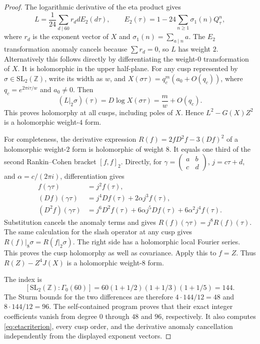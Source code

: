 \documentclass[11pt,a4paper]{article}
\theoremstyle{remark}
\newcommand{\code}[1]{\path{#1}}
\begin{document}
\begin{proof}
The logarithmic derivative of the eta product gives
\begin{equation}\label{eq:LE2}
 L=\frac1{24}\sum_{d\mid60}r_d d E_2(d\tau),
 \qquad
 E_2(\tau)=1-24\sum_{n\geq1}\sigma_1(n)Q_\tau^n,
\end{equation}
where $r_d$ is the exponent vector of $X$ and
$\sigma_1(n)=\sum_{a\mid n}a$. The $E_2$ transformation anomaly
cancels because $\sum r_d=0$, so $L$ has weight $2$.
Alternatively this follows directly by differentiating the weight-$0$
transformation of $X$. It is holomorphic in the upper half-plane.
For any cusp represented by $\sigma\in\mathrm{SL}_2(\mathbb Z)$,
write its width as $w$, and
$X(\sigma\tau)=q_c^m(a_0+O(q_c))$, where
$q_c=e^{2\pi i\tau/w}$ and $a_0\ne0$. Then
\[
 (L|_2\sigma)(\tau)=D\log X(\sigma\tau)
                  =\frac m w+O(q_c).
\]
This proves holomorphy at all cusps, including poles of $X$.
Hence $L^2-G(X)Z^2$ is a holomorphic weight-$4$ form.

For completeness, the derivative expression
$R(f)=2fD^2f-3(Df)^2$ of a holomorphic weight-$2$ form is holomorphic
of weight $8$. It equals one third of the second Rankin--Cohen bracket
$[f,f]_2$. Directly, for
$\gamma=\left(\begin{smallmatrix}a&b\\c&d\end{smallmatrix}\right)$,
$j=c\tau+d$, and $\alpha=c/(2\pi i)$, differentiation gives
\begin{align*}
 f(\gamma\tau)&=j^2f(\tau),\\
 (Df)(\gamma\tau)&=j^4Df(\tau)+2\alpha j^3f(\tau),\\
 (D^2f)(\gamma\tau)&=j^6D^2f(\tau)+6\alpha j^5Df(\tau)
                                  +6\alpha^2j^4f(\tau).
\end{align*}
Substitution cancels the anomaly terms and gives
$R(f)(\gamma\tau)=j^8R(f)(\tau)$. The same calculation for the slash
operator at any cusp gives
$R(f)|_8\sigma=R(f|_2\sigma)$. The right side has a holomorphic local
Fourier series. This proves the cusp holomorphy as well as covariance.
Apply this to $f=Z$. Thus $R(Z)-Z^4J(X)$ is a holomorphic
weight-$8$ form.

The index is
\[
 [\mathrm{SL}_2(\mathbb Z):\Gamma_0(60)]
 =60(1+1/2)(1+1/3)(1+1/5)=144.
\]
The Sturm bounds \cite{Sturm} for the two differences are therefore
$4\cdot144/12=48$ and $8\cdot144/12=96$.
The self-contained program \code{sun90_modparam_verify.py}
proves that their exact integer coefficients vanish from degree $0$
through $48$ and $96$, respectively. It also computes
\eqref{eq:etacriterion}, every cusp order, and the derivative anomaly
cancellation independently from the displayed exponent vectors.


\end{proof}
\end{document}
